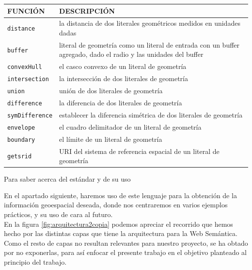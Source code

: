 \begin{table}[H]
	\centering
	\begin{tabular}{|l|m{8.3cm}|}
		\hline
		\rowcolor[HTML]{EFEFEF} 
		{\textbf{FUNCIÓN} } & {\textbf{DESCRIPCIÓN}} \\ \hline
\texttt{distance}		&       la distancia de dos literales geométricos medidos en unidades dadas                  \\ \hline
\texttt{buffer} &           literal de geometría como un literal de entrada con un buffer agregado, dado el radio y las unidades del buffer              \\ \hline
	\texttt{convexHull}	&      el casco convexo de un literal de geometría                   \\ \hline
\texttt{intersection} &          la intersección de dos literales de geometría               \\ \hline
\texttt{union}		&     unión de dos literales de geometría                    \\ \hline
\texttt{difference} &       la diferencia de dos literales de geometría                  \\ \hline
	\texttt{symDifference}	&       establecer la diferencia simétrica de dos literales de geometría                  \\ \hline
\texttt{envelope}  &              el cuadro delimitador de un literal de geometría           \\ \hline
\texttt{boundary}		&    el límite de un literal de geometría                     \\ \hline
\texttt{getsrid} &       URI del sistema de referencia espacial de un literal de geometría                  \\ \hline		
	\end{tabular}
\end{table}

Para saber acerca del estándar y de su uso 

En el apartado siguiente, haremos uso de este lenguaje para la obtención de la información geoespacial deseada, donde nos centraremos en varios ejemplos prácticos, y su uso de cara al futuro.\\


En la figura \ref{fig:arquitectura2copia} podemos apreciar el recorrido que hemos hecho por las distintas capas que tiene la arquitectura para la Web Semántica. Como el resto de capas no resultan relevantes para nuestro proyecto, se ha obtado por no exponerlas, para así enfocar el presente trabajo en el objetivo planteado al principio del trabajo.

